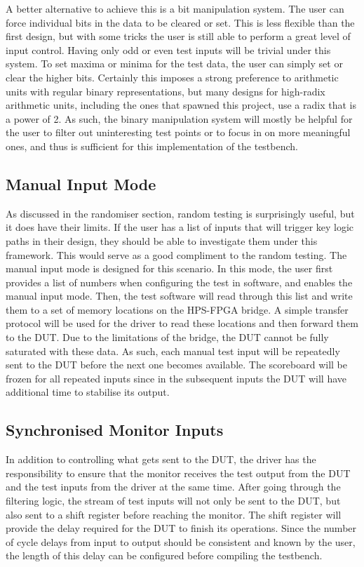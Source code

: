 A better alternative to achieve this is a bit manipulation system.
The user can force individual bits in the data to be cleared or set.
This is less flexible than the first design, but with some tricks the user is still able to perform a great level of input control.
Having only odd or even test inputs will be trivial under this system.
To set maxima or minima for the test data, the user can simply set or clear the higher bits.
Certainly this imposes a strong preference to arithmetic units with regular binary representations, but many designs for high-radix arithmetic units, including the ones that spawned this project, use a radix that is a power of 2.
As such, the binary manipulation system will mostly be helpful for the user to filter out uninteresting test points or to focus in on more meaningful ones, and thus is sufficient for this implementation of the testbench.

\subsection{Manual Input Mode}

As discussed in the randomiser section, random testing is surprisingly useful, but it does have their limits.
If the user has a list of inputs that will trigger key logic paths in their design, they should be able to investigate them under this framework.
This would serve as a good compliment to the random testing.
The manual input mode is designed for this scenario.
In this mode, the user first provides a list of numbers when configuring the test in software, and enables the manual input mode.
Then, the test software will read through this list and write them to a set of memory locations on the HPS-FPGA bridge.
A simple transfer protocol will be used for the driver to read these locations and then forward them to the DUT.
Due to the limitations of the bridge, the DUT cannot be fully saturated with these data.
As such, each manual test input will be repeatedly sent to the DUT before the next one becomes available.
The scoreboard will be frozen for all repeated inputs since in the subsequent inputs the DUT will have additional time to stabilise its output.

\subsection{Synchronised Monitor Inputs}
In addition to controlling what gets sent to the DUT, the driver has the responsibility to ensure that the monitor receives the test output from the DUT and the test inputs from the driver at the same time.
After going through the filtering logic, the stream of test inputs will not only be sent to the DUT, but also sent to a shift register before reaching the monitor.
The shift register will provide the delay required for the DUT to finish its operations.
Since the number of cycle delays from input to output should be consistent and known by the user, the length of this delay can be configured before compiling the testbench.


